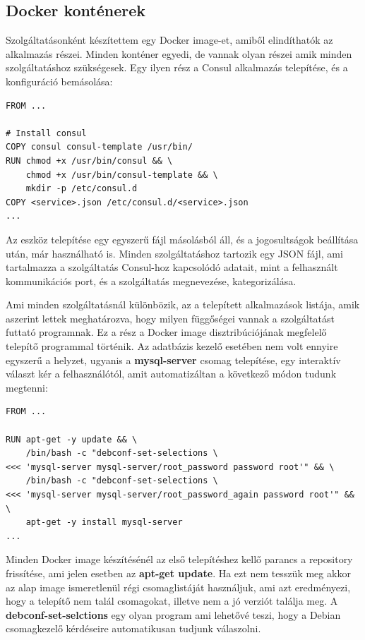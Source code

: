 \documentclass[11pt,magyar,a4paper,twoside,]{report}
\begin{document}
\subsection{Docker konténerek}\label{docker-kontuxe9nerek}

Szolgáltatásonként készítettem egy Docker image-et, amiből elindíthatók
az alkalmazás részei. Minden konténer egyedi, de vannak olyan részei
amik minden szolgáltatáshoz szükségesek. Egy ilyen rész a Consul
alkalmazás telepítése, és a konfiguráció bemásolása:

\begin{verbatim}
FROM ...

# Install consul
COPY consul consul-template /usr/bin/
RUN chmod +x /usr/bin/consul && \
    chmod +x /usr/bin/consul-template && \
    mkdir -p /etc/consul.d
COPY <service>.json /etc/consul.d/<service>.json
...
\end{verbatim}

Az eszköz telepítése egy egyszerű fájl másolásból áll, és a
jogosultságok beállítása után, már használható is. Minden
szolgáltatáshoz tartozik egy JSON fájl, ami tartalmazza a szolgáltatás
Consul-hoz kapcsolódó adatait, mint a felhasznált kommunikációs port, és
a szolgáltatás megnevezése, kategorizálása.

Ami minden szolgáltatásnál különbözik, az a telepített alkalmazások
listája, amik aszerint lettek meghatározva, hogy milyen függőségei
vannak a szolgáltatást futtató programnak. Ez a rész a Docker image
disztribúciójának megfelelő telepítő programmal történik. Az adatbázis
kezelő esetében nem volt ennyire egyszerű a helyzet, ugyanis a
\textbf{mysql-server} csomag telepítése, egy interaktív választ kér a
felhasználótól, amit automatizáltan a következő módon tudunk megtenni:

\begin{verbatim}
FROM ...

RUN apt-get -y update && \
    /bin/bash -c "debconf-set-selections \
<<< 'mysql-server mysql-server/root_password password root'" && \
    /bin/bash -c "debconf-set-selections \
<<< 'mysql-server mysql-server/root_password_again password root'" && \
    apt-get -y install mysql-server
...
\end{verbatim}

Minden Docker image készítésénél az első telepítéshez kellő parancs a
repository frissítése, ami jelen esetben az \textbf{apt-get update}. Ha
ezt nem tesszük meg akkor az alap image ismeretlenül régi csomaglistáját
használjuk, ami azt eredményezi, hogy a telepítő nem talál csomagokat,
illetve nem a jó verziót találja meg. A \textbf{debconf-set-selctions}
egy olyan program ami lehetővé teszi, hogy a Debian csomagkezelő
kérdéseire automatikusan tudjunk válaszolni.
\end{document}
